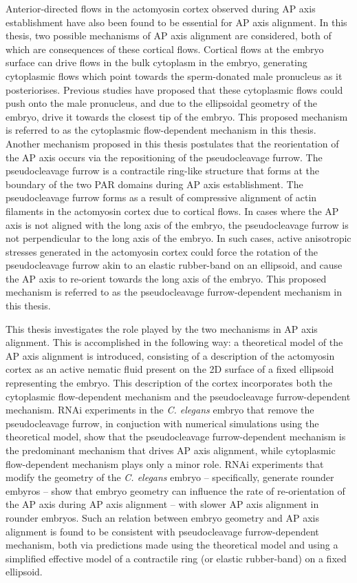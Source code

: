 \documentclass[a4paper]{article}
\begin{document}
Anterior-directed flows in the actomyosin cortex observed during AP axis establishment have also been found to be essential for AP axis alignment. In this thesis, two possible mechanisms of AP axis alignment are considered, both of which are consequences of these cortical flows. Cortical flows at the embryo surface can drive flows in the bulk cytoplasm in the embryo, generating cytoplasmic flows which point towards the sperm-donated male pronucleus as it posteriorises. Previous studies have proposed that these cytoplasmic flows could push onto the male pronucleus, and due to the ellipsoidal geometry of the embryo, drive it towards the closest tip of the embryo. This proposed mechanism is referred to as the cytoplasmic flow-dependent mechanism in this thesis. Another mechanism proposed in this thesis postulates that the reorientation of the AP axis occurs via the repositioning of the pseudocleavage furrow. The pseudocleavage furrow is a contractile ring-like structure that forms at the boundary of the two PAR domains during AP axis establishment. The pseudocleavage furrow forms as a result of compressive alignment of actin filaments in the actomyosin cortex due to cortical flows. In cases where the AP axis is not aligned with the long axis of the embryo, the pseudocleavage furrow is
not perpendicular to the long axis of the embryo. In such cases, active anisotropic stresses generated in the actomyosin cortex could force the rotation of the pseudocleavage furrow akin to an elastic rubber-band on an ellipsoid, and cause the AP axis to re-orient towards the long axis of the embryo. This proposed mechanism is referred to as the pseudocleavage furrow-dependent mechanism in this thesis.

This thesis investigates the role played by the two mechanisms in AP axis alignment. This is accomplished in the following way: a theoretical model of the AP axis alignment is introduced, consisting of a description of the actomyosin cortex as an active nematic fluid present on the 2D surface of a fixed ellipsoid representing the embryo. This description of the cortex incorporates both the cytoplasmic flow-dependent mechanism and the pseudocleavage furrow-dependent mechanism. RNAi experiments in the \textit{C. elegans} embryo that remove the pseudocleavage furrow, in conjuction with numerical simulations using the theoretical model, show that the pseudocleavage furrow-dependent mechanism is the predominant mechanism that drives AP axis alignment, while cytoplasmic flow-dependent mechanism plays only a minor role. RNAi experiments that modify the geometry of the \textit{C. elegans} embryo -- specifically, generate rounder embyros -- show that embryo geometry can influence the rate of re-orientation of the AP axis during AP axis alignment -- with slower AP axis alignment in rounder embryos. Such an relation between embryo geometry and AP axis alignment is found to be consistent with pseudocleavage furrow-dependent mechanism, both via predictions made using the theoretical model and using a simplified effective model of a contractile ring (or elastic rubber-band) on a fixed ellipsoid. 
\end{document}
